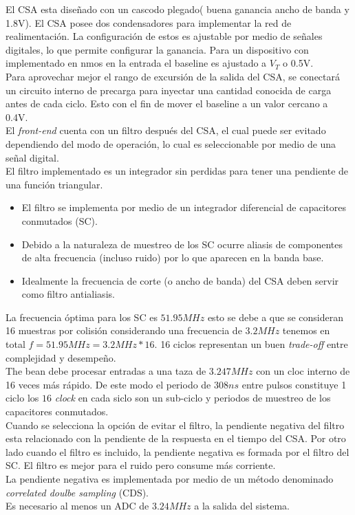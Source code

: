 El CSA esta diseñado con un cascodo plegado( buena ganancia ancho de banda y 1.8V). El CSA posee dos condensadores para implementar la red de realimentación. La configuración de estos es ajustable por medio de señales digitales, lo que permite configurar la ganancia. Para un dispositivo con implementado en nmos en la entrada el baseline es ajustado a $V_T$ o 0.5V.\\
Para aprovechar mejor el rango de excursión de la salida del CSA, se conectará un circuito interno de precarga para inyectar una cantidad conocida de carga antes de cada ciclo. Esto con el fin de mover el baseline a un valor cercano a 0.4V.\\
El \textit{front-end} cuenta con un filtro después del CSA, el cual puede ser evitado dependiendo del modo de operación, lo cual es seleccionable por medio de una señal digital.\\
El filtro implementado es un integrador sin perdidas para tener una pendiente de una función triangular.
\begin{itemize}
\item El filtro se implementa por medio de un integrador diferencial de capacitores conmutados (SC).
\item Debido a la naturaleza de muestreo de los SC ocurre aliasis de componentes de alta frecuencia (incluso ruido) por lo que aparecen en la banda base.
\item Idealmente la frecuencia de corte (o ancho de banda) del CSA deben servir como filtro antialiasis.
\end{itemize}
La frecuencia óptima para los SC es $51.95MHz$ esto se debe a que se consideran 16 muestras por colisión considerando una frecuencia de $3.2MHz$ tenemos en total $f=51.95MHz=3.2MHz*16$. 16 ciclos representan un buen \textit{trade-off} entre complejidad y desempeño.\\
The bean debe procesar  entradas a una taza de $3.247MHz$ con un cloc interno de 16 veces más rápido. De este modo el periodo de $308ns$ entre pulsos constituye 1 ciclo los $16$ \textit{clock} en cada siclo son un sub-ciclo y periodos de muestreo de los capacitores conmutados.\\
Cuando se selecciona la opción de evitar el filtro, la pendiente negativa del filtro esta relacionado con la pendiente de la respuesta en el tiempo del CSA. Por otro lado cuando el filtro es incluido, la pendiente negativa es formada por el filtro del SC. El filtro es mejor para el ruido pero consume más corriente.\\
La pendiente negativa es implementada por medio de un método denominado \textit{correlated doulbe sampling} (CDS).\\
Es necesario al menos un ADC de $3.24MHz$ a la salida del sistema.
